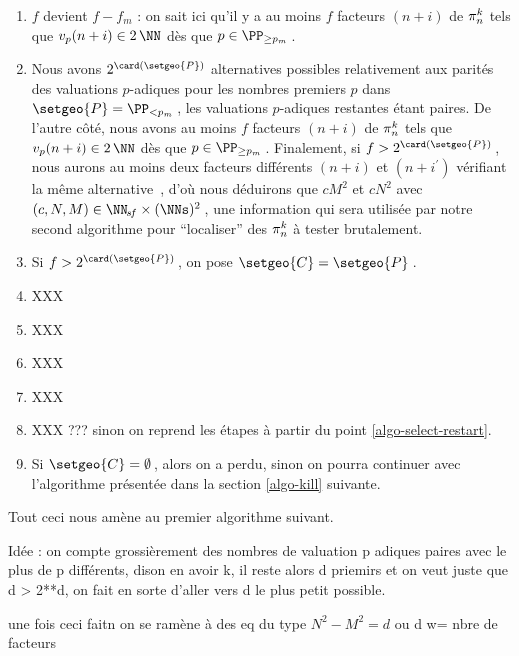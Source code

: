 \begin{enumerate}
	\item $f$ devient $f - f_m$ : on sait ici qu'il y a au moins $f$ facteurs $(n+i)$ de $\consprod$ tels que $\padicval{n+i} \in 2\,\NN$ dès que $p \in \PP_{\geq p_m}$\,.


	\item Nous avons $2^{\card ( \setgeo{P} )}$ alternatives  possibles relativement aux parités des valuations $p$-adiques pour les nombres premiers $p$ dans $\setgeo{P} = \PP_{< p_m}$\,, les valuations $p$-adiques restantes étant paires.
	De l'autre côté, nous avons au moins $f$ facteurs $(n+i)$ de $\consprod$ tels que $\padicval{n+i} \in 2\,\NN$ dès que $p \in \PP_{\geq p_m}$\,.
	Finalement, si $f > 2^{\card ( \setgeo{P} )}$\,, nous aurons au moins deux facteurs différents $(n+i)$ et $(n+i^\prime)$ vérifiant la même alternative \,, d'où nous déduirons que $c M^2$ et $c N^2$ avec $(c, N, M) \in \NNsf \times ( \NNs )^2$\,, une information qui sera utilisée par notre second algorithme pour \enquote{localiser} des $\consprod$ à tester brutalement.


	\item Si $f > 2^{\card ( \setgeo{P} )}$\,, on pose $\setgeo{C} = \setgeo{P}$\,.


	\item XXX 


	\item XXX 


	\item XXX 


	\item XXX 


	\item XXX ??? sinon on reprend les étapes à partir du point \ref{algo-select-restart}.


	\item Si $\setgeo{C} = \emptyset$\,, alors on a perdu, sinon on pourra continuer avec l'algorithme présentée dans la section \ref{algo-kill} suivante.
\end{enumerate}


Tout ceci nous amène au premier algorithme suivant.



\newpage
Idée : on compte grossièrement des nombres de valuation p adiques paires avec le plus de p différents, dison en avoir k, il reste alors d priemirs et on veut juste que d > 2**d, on fait en sorte d'aller vers d le plus petit possible.

une fois ceci faitn on se ramène à des eq du type $N^2 - M^2 = d$ ou d w= nbre de facteurs


